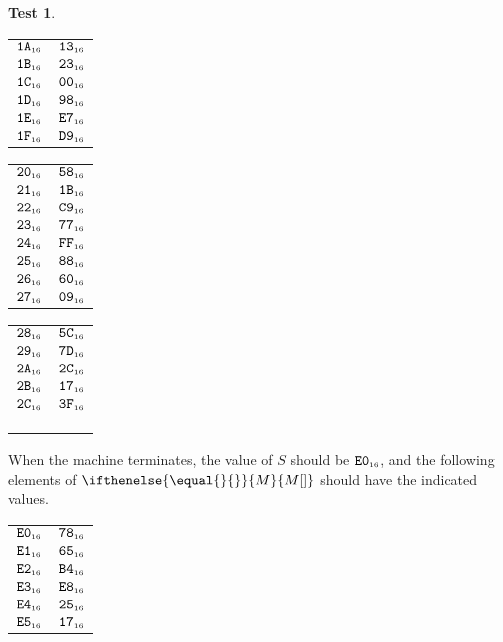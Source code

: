 \documentclass[a4paper,12pt]{article}
\makeatletter
\newcommand{\num}[1]{\texttt{#1}}
\newcommand{\hex}[1]{\num{#1}_{\textup{\tiny 16}}}
\newcommand{\MEM}[1]{\ifthenelse{\equal{#1}{}}{M}{M[#1]}}
\newcommand{\SP}{S}
\theoremstyle{definition}
\newtheorem{test}{Test}
\newenvironment{memtable}{%
  \begin{trivlist}
    \item
    }{%
    \end{trivlist}}
\newenvironment{memcolumn}{%
  \begin{tabular}{@{}ll@{}}
    \hline}
    {%
    \hline
  \end{tabular}}
\newcommand{\memspace}{\qquad}
\makeatother
\begin{document}
\begin{test}
\begin{memtable}
\begin{memcolumn}
      $\hex{1A}$ & $\hex{13}$ \\
      $\hex{1B}$ & $\hex{23}$ \\
      $\hex{1C}$ & $\hex{00}$ \\
      $\hex{1D}$ & $\hex{98}$ \\
      $\hex{1E}$ & $\hex{E7}$ \\
      $\hex{1F}$ & $\hex{D9}$ \\
    \end{memcolumn}
    \memspace
    \begin{memcolumn}
      $\hex{20}$ & $\hex{58}$ \\
      $\hex{21}$ & $\hex{1B}$ \\
      $\hex{22}$ & $\hex{C9}$ \\
      $\hex{23}$ & $\hex{77}$ \\
      $\hex{24}$ & $\hex{FF}$ \\
      $\hex{25}$ & $\hex{88}$ \\
      $\hex{26}$ & $\hex{60}$ \\
      $\hex{27}$ & $\hex{09}$ \\
    \end{memcolumn}
    \memspace
    \begin{memcolumn}
      $\hex{28}$ & $\hex{5C}$ \\
      $\hex{29}$ & $\hex{7D}$ \\
      $\hex{2A}$ & $\hex{2C}$ \\
      $\hex{2B}$ & $\hex{17}$ \\
      $\hex{2C}$ & $\hex{3F}$ \\
      \\
      \\
      \\
    \end{memcolumn}
  \end{memtable}
  When the machine terminates, the value of $\SP$ should be $\hex{E0}$, and the following elements of $\MEM{}$ should have the indicated values.
  \begin{memtable}
    \begin{memcolumn}
      $\hex{E0}$ & $\hex{78}$ \\
      $\hex{E1}$ & $\hex{65}$ \\
      $\hex{E2}$ & $\hex{B4}$ \\
      $\hex{E3}$ & $\hex{E8}$ \\
      $\hex{E4}$ & $\hex{25}$ \\
      $\hex{E5}$ & $\hex{17}$ \\

\end{memcolumn}
\end{memtable}
\end{test}
\end{document}
